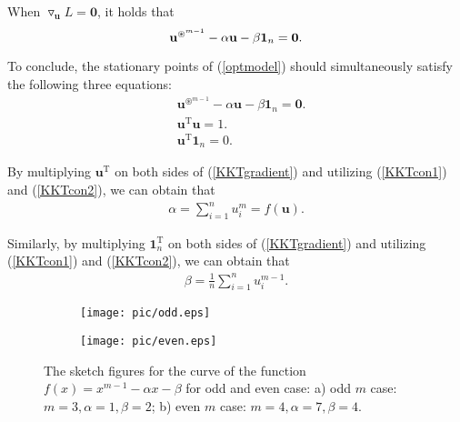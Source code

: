  When
$ \triangledown_{\mathbf u}L = \mathbf 0$,  it  holds  that 
\begin{equation}
\notag
\mathbf u ^{\circledast^{m-1}}-\alpha \mathbf u-\beta \mathbf  1_{n} = \mathbf 0 . 
\end{equation}

To   conclude,  the  
stationary points of  (\ref{optmodel})
should  simultaneously 
satisfy 
  the  following  three  equations:  
\begin{align}
\label{KKTgradient}
&\mathbf u ^{\circledast^{m-1}}-\alpha \mathbf u-\beta \mathbf  1_{n} = \mathbf 0 . 
\\
\label{KKTcon1}
&\mathbf   u^{\mathrm T}   \mathbf   u =1 .
\\
\label{KKTcon2}
&\mathbf   u^{\mathrm T}   \mathbf   1_{n} =0.
\end{align}

By multiplying  $\mathbf   u^{\mathrm T}$ on  both sides of (\ref{KKTgradient}) and utilizing  (\ref{KKTcon1})  and
(\ref{KKTcon2}), 
we can  obtain  that 
\begin{align}\label{alphares}
\alpha 
=
\sum\limits_{i=1}^{n}  u_{i}^{m}
=
f(\mathbf u).	
\end{align}

Similarly, by multiplying  $  \mathbf   1_{n}^{\mathrm T}$ on  both sides of (\ref{KKTgradient}) and utilizing  (\ref{KKTcon1})  and
(\ref{KKTcon2}), 
 we can  obtain  that 
\begin{align}\label{beatres}
\beta 
=
\frac 1 n  \sum\limits_{i=1}^{n}  u_{i}^{m-1}.	
\end{align} 


\begin{figure*}[t]
	\centering
	\begin{subfigure}[htbp!]{0.39\textwidth}
		\texttt{[image: pic/odd.eps]}
		\subcaption{}
		\label{odd}
	\end{subfigure}
	\begin{subfigure}[htbp!]{0.39\textwidth}
		\texttt{[image: pic/even.eps]}
		\subcaption{}
		\label{even}
	\end{subfigure}
	\caption{
		\quad 
		The  sketch figures   for the curve  of   the  function   $  f(x) = x^{m-1} -\alpha x - \beta$ for odd and even case:  a)   odd  $m$  case: $m=3, \alpha=1, \beta =2$;   b)   even   $m$  case: 
$m=4, \alpha=7, \beta =4$.	}
	\label{curveplot}
\end{figure*}


